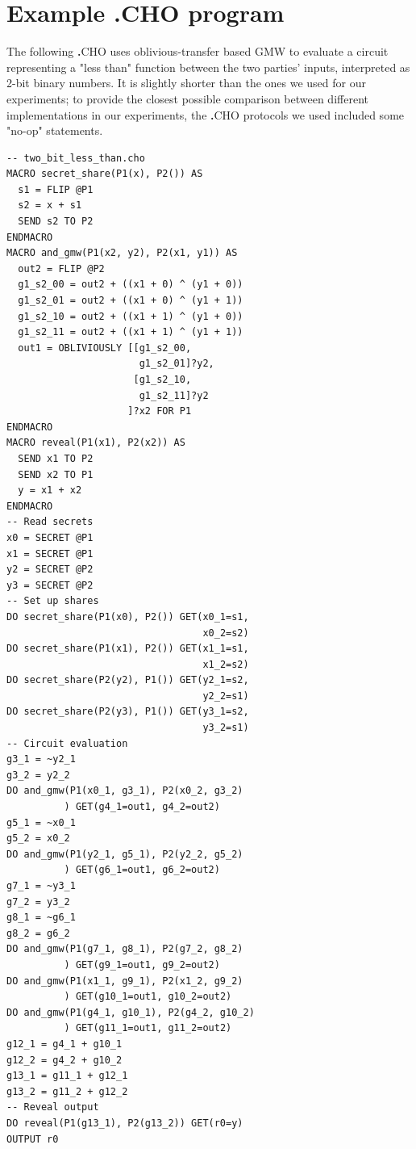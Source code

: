 \documentclass[compsoc, conference, a4paper, 10pt, times]{IEEEtran}
\newcommand{\langname}{\textsc{\textbf{.}CHO}\xspace}
\begin{document}


\section{Example \langname program}\label{sec:example-cho}

The following \langname uses oblivious-transfer based GMW to evaluate a circuit representing a "less than" function
between the two parties' inputs, interpreted as 2-bit binary numbers.
It is slightly shorter than the ones we used for our experiments;
to provide the closest possible comparison between different implementations in our experiments,
the \langname protocols we used included some "no-op" statements.

\begin{small}
\begin{verbatim}
-- two_bit_less_than.cho
MACRO secret_share(P1(x), P2()) AS
  s1 = FLIP @P1
  s2 = x + s1
  SEND s2 TO P2
ENDMACRO
MACRO and_gmw(P1(x2, y2), P2(x1, y1)) AS
  out2 = FLIP @P2
  g1_s2_00 = out2 + ((x1 + 0) ^ (y1 + 0))
  g1_s2_01 = out2 + ((x1 + 0) ^ (y1 + 1))
  g1_s2_10 = out2 + ((x1 + 1) ^ (y1 + 0))
  g1_s2_11 = out2 + ((x1 + 1) ^ (y1 + 1))
  out1 = OBLIVIOUSLY [[g1_s2_00,
                       g1_s2_01]?y2,
                      [g1_s2_10,
                       g1_s2_11]?y2
                     ]?x2 FOR P1
ENDMACRO
MACRO reveal(P1(x1), P2(x2)) AS
  SEND x1 TO P2
  SEND x2 TO P1
  y = x1 + x2
ENDMACRO
-- Read secrets
x0 = SECRET @P1
x1 = SECRET @P1
y2 = SECRET @P2
y3 = SECRET @P2
-- Set up shares
DO secret_share(P1(x0), P2()) GET(x0_1=s1,
                                  x0_2=s2)
DO secret_share(P1(x1), P2()) GET(x1_1=s1,
                                  x1_2=s2)
DO secret_share(P2(y2), P1()) GET(y2_1=s2,
                                  y2_2=s1)
DO secret_share(P2(y3), P1()) GET(y3_1=s2,
                                  y3_2=s1)
-- Circuit evaluation
g3_1 = ~y2_1
g3_2 = y2_2
DO and_gmw(P1(x0_1, g3_1), P2(x0_2, g3_2)
          ) GET(g4_1=out1, g4_2=out2)
g5_1 = ~x0_1
g5_2 = x0_2
DO and_gmw(P1(y2_1, g5_1), P2(y2_2, g5_2)
          ) GET(g6_1=out1, g6_2=out2)
g7_1 = ~y3_1
g7_2 = y3_2
g8_1 = ~g6_1
g8_2 = g6_2
DO and_gmw(P1(g7_1, g8_1), P2(g7_2, g8_2)
          ) GET(g9_1=out1, g9_2=out2)
DO and_gmw(P1(x1_1, g9_1), P2(x1_2, g9_2)
          ) GET(g10_1=out1, g10_2=out2)
DO and_gmw(P1(g4_1, g10_1), P2(g4_2, g10_2)
          ) GET(g11_1=out1, g11_2=out2)
g12_1 = g4_1 + g10_1
g12_2 = g4_2 + g10_2
g13_1 = g11_1 + g12_1
g13_2 = g11_2 + g12_2
-- Reveal output
DO reveal(P1(g13_1), P2(g13_2)) GET(r0=y)
OUTPUT r0
\end{verbatim}
\end{small}
\end{document}
